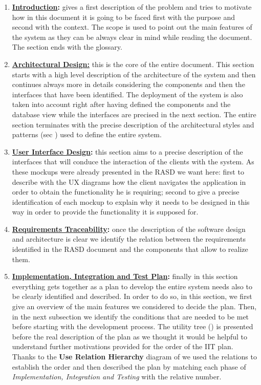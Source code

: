 		\begin{enumerate}
			\item \textbf{\hyperref[sec:introduction]{Introduction}:} gives a first description of the problem and tries to motivate how in this document it is going to be faced first with the purpose and second with the context. The scope is used to point out the main features of the system as they can be always clear in mind while reading the document. The section ends with the glossary.
			
			\item \textbf{\hyperref[sec:architecturalDesign]{Architectural Design:}} this is the core of the entire document. This section starts with a high level description of the architecture of the system and then continues always more in details considering the components and then the interfaces that have been identified. The deployment of the system is also taken into account right after having defined the components and the database view while the interfaces are precised in the next section. The entire section terminates with the precise description of the architectural styles and patterns (sec ) used to define the entire system.
			
			\item \textbf{\hyperref[sec:userInterfaceDesign]{User Interface Design}:} this section aims to a precise description of the interfaces that will conduce the interaction of the clients with the system. As these mockups were already presented in the RASD we want here: first to describe with the UX diagrams how the client navigates the application in order to obtain the functionality he is requiring; second to give a precise identification of each mockup to explain why it needs to be designed in this way in order to provide the functionality it is supposed for.
			
			\item \textbf{\hyperref[sec:requirementsTraceability]{Requirements Traceability}:} once the description of the software design and architecture is clear we identify the relation between the requirements identified in the RASD document \cite{RASD} and the components that allow to realize them.
			
			\item \textbf{\hyperref[sec:iitPlan]{Implementation, Integration and Test Plan}:} finally in this section everything gets together as a plan to develop the entire system needs also to be clearly identified and described. In order to do so, in this section, we first give an overview of the main features we considered to decide the plan. Then, in the next subsection we identify the conditions that are needed to be met before starting with the development process. The utility tree () is presented before the real description of the plan as we thought it would be helpful to understand further motivations provided for the order of the IIT plan. Thanks to the \textbf{Use Relation Hierarchy} diagram of  we used the relations to establish the order and then described the plan by matching each phase of \emph{Implementation, Integration and Testing} with the relative number.
			

\end{enumerate}
